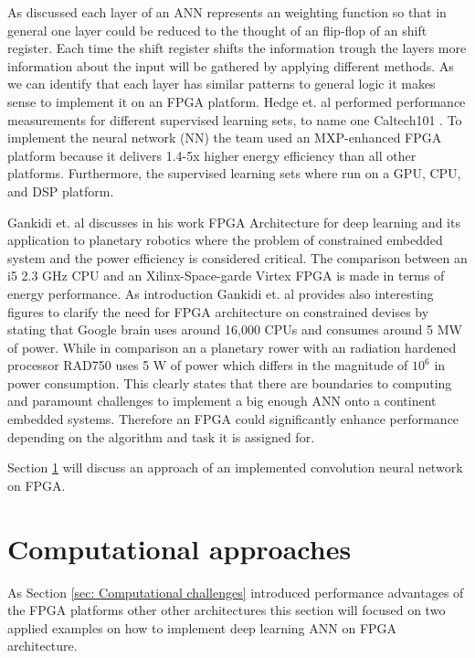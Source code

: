 \documentclass[conference]{IEEEtran}
\begin{document}
As discussed each layer of an ANN represents an weighting function so that in general one layer could be reduced to the thought of an flip-flop of an shift register. Each time the shift register shifts the information trough the layers more information about the input will be gathered by applying different methods. As we can identify that each layer has similar patterns to general logic it makes sense to implement it on an FPGA platform. Hedge et. al \cite{Hegde} performed performance measurements for different supervised learning sets, to name one Caltech101 \cite{Caltech101}. To implement the neural network (NN)  the team used an MXP-enhanced FPGA platform because it delivers 1.4-5x higher energy efficiency than all other platforms.  Furthermore, the supervised learning sets where run on a GPU, CPU, and DSP platform.

Gankidi et. al \cite{Gankidi} discusses in his work FPGA Architecture for deep learning and its application to planetary robotics where the problem of constrained embedded system and the power efficiency is considered critical. The comparison between an i5 2.3 GHz CPU and an Xilinx-Space-garde Virtex FPGA is made in terms of energy performance. As introduction Gankidi et. al provides also interesting figures to clarify the need for FPGA architecture on constrained devises by stating that Google brain uses around 16,000 CPUs and consumes around 5 MW of power. While in comparison an a planetary rower with an radiation hardened processor RAD750 uses 5 W of power which differs in the magnitude of $10^6$ in power consumption. This clearly states that there are boundaries to computing and paramount challenges to implement a big enough ANN onto a continent embedded systems. Therefore an FPGA could significantly enhance performance depending on the algorithm and task it is assigned for.

Section \ref{sec: Computational approaches} will discuss an approach of an implemented convolution neural network on FPGA. 

\section{Computational approaches}\label{sec: Computational approaches}
As Section \ref{sec: Computational challenges} introduced performance advantages of the FPGA platforms other other architectures this section will focused on two applied examples on how to implement deep learning ANN on FPGA architecture.
\end{document}
